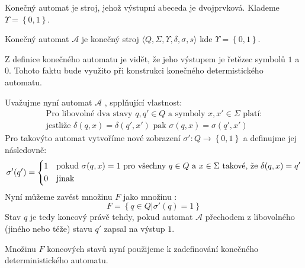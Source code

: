 Konečný automat je stroj, jehož výstupní abeceda je dvojprvková. Klademe $\Upsilon = \left\{ 0, 1 \right\}$.
\begin{definition}\label{finite-automata}
Konečný automat $\mathcal{A}$ je konečný stroj $\langle Q, \Sigma, \Upsilon,  \delta, \sigma, s \rangle$ kde $\Upsilon = \left\{ 0, 1 \right\}$.
\end{definition}

Z definice konečného automatu je vidět, že jeho výstupem je řetězec symbolů $1$ a $0$. Tohoto faktu bude využito při konstrukci konečného determistického automatu.

Uvažujme nyní automat $\mathcal{A}$ , spplňující vlastnost:
$$
\begin{array}{c}
\text{Pro libovolné dva stavy } q, q' \in Q \text{ a symboly } x, x' \in \Sigma \text{ platí:}\\
\text{jestliže } \delta(q, x) = \delta(q', x') \text{ pak } \sigma(q, x) = \sigma(q', x')
\end{array}
$$
Pro takovýto automat vytvoříme nové zobrazení $\sigma': Q \rightarrow \left\{ 0, 1 \right\}$ a definujme jej následovně:
$$
  \sigma'(q') = \begin{dcases}
    1 	& \text{pokud $\sigma(q, x) = 1$ pro všechny $q \in Q$ a $x \in \Sigma$ takové, že $\delta(q, x) = q'$} \\
    0	& \text{jinak}
  \end{dcases}
$$
Nyní můžeme zavést množinu $F$ jako množinu :
$$
  F = \left\{ q \in Q | \sigma'(q) = 1 \right\}
$$
Stav $q$ je tedy koncový právě tehdy, pokud automat $\mathcal{A}$ přechodem z libovolného (jiného nebo téže) stavu $q'$ zapsal na výstup $1$. 

Množinu $F$ koncových stavů nyní použijeme k zadefinování konečného deterministického automatu.
